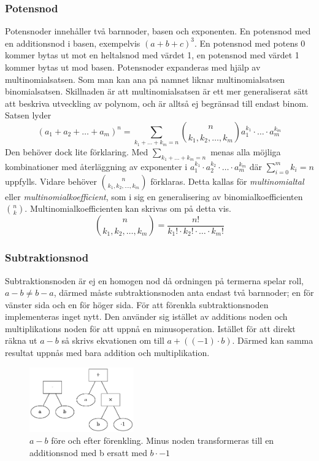 \documentclass[12pt,a4paper]{article}
\begin{document}
\subsubsection{Potensnod}
\label{subsubsec:potensnod}
Potensnoder innehåller två barnnoder, basen och exponenten. En potensnod med en additionsnod i basen, exempelvis \((a+b+c)^{3}\). En potensnod med potens 0 kommer bytas ut mot en heltalsnod med värdet 1, en potensnod med värdet 1 kommer bytas ut mod basen. Potensnoder expanderas med hjälp av multinomialsatsen. Som man kan ana på namnet liknar multinomialsatsen binomialsatsen. Skillnaden är att multinomialsatsen är ett mer generaliserat sätt att beskriva utveckling av polynom, och är alltså ej begränsad till endast binom. Satsen lyder
\[(a_{1}+a_{2}+\ldots+a_{m})^{n}=\displaystyle\sum_{k_{1}+\dots+k_{m}=n}\binom{n}{k_{1},k_{2},\dots,k_{m}}a_{1}^{k_{1}}\cdot\ldots\cdot a_{m}^{k_{m}}\]
Den behöver dock lite förklaring. Med \(\displaystyle\sum_{k_{1}+\dots+k_{m}=n}\) menas alla möjliga kombinationer med återläggning av exponenter i \(a_{1}^{k_{1}}\cdot a_{2}^{k_{2}}\cdot\ldots\cdot a_{m}^{k_{m}}\) där \(\displaystyle\sum_{i=0}^{m}k_{i}=n\) uppfylls. Vidare behöver  \(\binom{n}{k_{1},k_{2},\ldots,k_{m}}\) förklaras. Detta kallas för \textit{multinomialtal} eller \textit{multinomialkoefficient}, som i sig en generalisering av binomialkoefficienten \(\binom{n}{k}\). Multinomialkoefficienten kan skrivas om på detta vis.
\[\binom{n}{k_{1},k_{2},\ldots,k_{m}}=\frac{n!}{k_{1}!\cdot k_{2}!\cdot\ldots\cdot k_{m}!}\]
\subsubsection{Subtraktionsnod}
Subtraktionsnoden är ej en homogen nod då ordningen på termerna spelar roll, \(a-b\neq b-a\), därmed måste subtraktionsnoden anta endast två barnnoder; en för vänster sida och en för höger sida. För att förenkla subtraktionsnoden implementeras inget nytt. Den använder sig istället av additions noden och multiplikations noden för att uppnå en minusoperation. Istället för att direkt räkna ut \(a-b\) så skrivs ekvationen om till \(a+((-1)\cdot b)\). Därmed kan samma resultat uppnås med bara addition och multiplikation.
\begin{figure}[h!]
  \centering
  \includegraphics[width=0.4\textwidth]{image-merged3.png}
  \caption{\(a-b\) före och efter förenkling. Minus noden transformeras till en additionsnod med b ersatt med \(b \cdot -1\)}
\end{figure}
\end{document}
